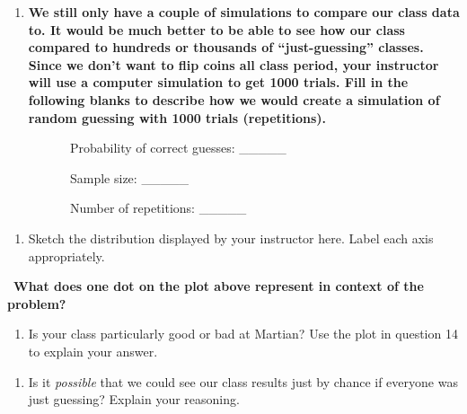\documentclass[
]{report}
\providecommand{\tightlist}{%
  \setlength{\itemsep}{0pt}\setlength{\parskip}{0pt}}
\begin{document}
\vspace{1.2in}

\begin{enumerate}
\def\labelenumi{\arabic{enumi}.}
\setcounter{enumi}{12}
\tightlist
\item
  \textbf{We still only have a couple of simulations to compare our class data to. It would be much better to be able to see how our class compared to hundreds or thousands of ``just-guessing'' classes. Since we don't want to flip coins all class period, your instructor will use a computer simulation to get 1000 trials. Fill in the following blanks to describe how we would create a simulation of random guessing with 1000 trials (repetitions).}
\end{enumerate}

~~~~~~~~~~Probability of correct guesses: \_\_\_\_\_

\vspace{0.05in}

~~~~~~~~~~Sample size: \_\_\_\_\_

\vspace{0.05in}

~~~~~~~~~~Number of repetitions: \_\_\_\_\_

\vspace{0.05in}

\newpage

\begin{enumerate}
\def\labelenumi{\arabic{enumi}.}
\setcounter{enumi}{13}
\tightlist
\item
  Sketch the distribution displayed by your instructor here. Label each axis appropriately.
\end{enumerate}

\vspace{1.5in}

~\textbf{What does one dot on the plot above represent in context of the problem?}

\vspace{1in}

\begin{enumerate}
\def\labelenumi{\arabic{enumi}.}
\setcounter{enumi}{14}
\tightlist
\item
  Is your class particularly good or bad at Martian? Use the plot in question 14 to explain your answer.
\end{enumerate}

\vspace{.5in}

\begin{enumerate}
\def\labelenumi{\arabic{enumi}.}
\setcounter{enumi}{15}
\tightlist
\item
  Is it \emph{possible} that we could see our class results just by chance if everyone was just guessing? Explain your reasoning.
\end{enumerate}
\end{document}
